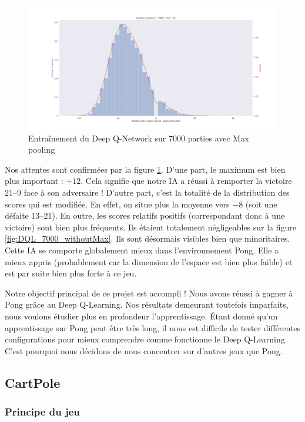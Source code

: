 \begin{figure}[h]
 \centering
 \includegraphics[width  = \textwidth]{img/DQL_7000_withMax.png}
 \caption{Entraînement du Deep Q-Network sur 7000 parties avec Max pooling}
 \label{fig:DQL_7000_withMax}
\end{figure}

Nos attentes sont confirmées par la figure \ref{fig:DQL_7000_withMax}. D'une part, le maximum est bien plus important : $+\num{12}$. Cela signifie que notre IA a 
réussi à remporter la victoire 21--9 face à son adversaire ! D'autre part, c'est la totalité de la distribution des scores qui est modifiée. En effet, on situe 
plus la moyenne vers $\num{-8}$ (soit une défaite 13--21). En outre, les scores relatifs positifs (correspondant donc à une victoire) sont bien plus fréquents. Ils
étaient totalement négligeables sur la figure \ref{fig:DQL_7000_withoutMax}. Ils sont désormais visibles bien que minoritaires. Cette IA se comporte
globalement mieux dans l'environnement Pong. Elle a mieux appris (probablement car la dimension de l'espace est bien plus faible) et est par suite bien plus forte
à ce jeu.

Notre objectif principal de ce projet est accompli ! Nous avons réussi à gagner à Pong grâce au Deep Q-Learning. Nos résultats demeurant toutefois imparfaits, nous
voulons étudier plus en profondeur l'apprentissage. Étant donné qu'un apprentissage sur Pong peut être très long, il nous est difficile de tester différentes
configurations pour mieux comprendre comme fonctionne le Deep Q-Learning. C'est pourquoi nous décidons de nous concentrer sur d'autres jeux que Pong.


\subsection{CartPole}

\subsubsection{Principe du jeu}

